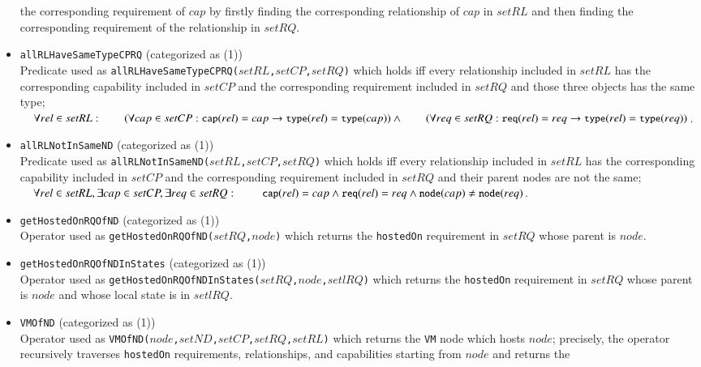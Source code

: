 \documentclass[12pt]{report}
\newcommand{\ra}{\rightarrow}
\newcommand{\mbstt}[1]{\mbox{\small{\tt {#1}}}}
\newcommand{\stt}[1]{{\small{\tt {#1}}}}
\begin{document}
\begin{itemize}
 the corresponding requirement of $cap$ by firstly finding the
 corresponding relationship of $cap$ in $setRL$ and then finding the
 corresponding requirement of the relationship in $setRQ$.
\item \stt{allRLHaveSameTypeCPRQ} (categorized as (1))\\ 
  Predicate used as
  \stt{allRLHaveSameTypeCPRQ($setRL$,$setCP$,$setRQ$)} which holds iff
  every relationship included in $setRL$ has the corresponding
  capability included in $setCP$ and the corresponding requirement
  included in $setRQ$ and those three objects has the same type;\\ 
  $~~~~\forall rel\in setRL:\\
  ~~~~~~~~(\forall cap\in setCP:\mbstt{cap}(rel)=cap\ra\mbstt{type}(rel)=\mbstt{type}(cap))\land\\
  ~~~~~~~~(\forall req\in setRQ:\mbstt{req}(rel)=req\ra\mbstt{type}(rel)=\mbstt{type}(req))$.
\item \stt{allRLNotInSameND} (categorized as (1))\\ 
  Predicate used as
  \stt{allRLNotInSameND($setRL$,$setCP$,$setRQ$)} which holds iff
  every relationship included in $setRL$ has the corresponding
  capability included in $setCP$ and the corresponding requirement
  included in $setRQ$ and their parent nodes are not the same;\\ 
  $~~~~\forall rel\in setRL, \exists cap\in setCP, \exists req\in setRQ:\\
  ~~~~~~~~~\mbstt{cap}(rel)=cap\land\mbstt{req}(rel)=req\land
  \mbstt{node}(cap)\ne\mbstt{node}(req)$.
\item \stt{getHostedOnRQOfND} (categorized as (1))\\
 Operator used as \stt{getHostedOnRQOfND($setRQ$,$node$)} which returns
 the {\tt hostedOn} requirement in $setRQ$ whose parent is $node$.
\item \stt{getHostedOnRQOfNDInStates} (categorized as (1))\\
 Operator used as
 \stt{getHostedOnRQOfNDInStates($setRQ$,$node$,$setlRQ$)} which
 returns the {\tt hostedOn} requirement in $setRQ$ whose parent is
 $node$ and whose local state is in $setlRQ$.
\item \stt{VMOfND} (categorized as (1))\\
 Operator used as \stt{VMOfND($node$,$setND$,$setCP$,$setRQ$,$setRL$)}
 which returns the {\tt VM} node which hosts $node$; precisely, the
 operator recursively traverses {\tt hostedOn} requirements,
 relationships, and capabilities starting from $node$ and returns the

\end{itemize}
\end{document}
